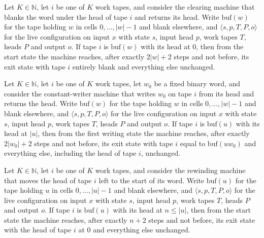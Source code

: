 \begin{theorem}
\label{Turing.NTimeDiag.qy_clear}
\leanok
{}
Let $K \in \mathbb{N}$, let $i$ be one of $K$ work tapes, and consider the clearing machine that
blanks the word under the head of tape $i$ and returns its head. Write $\mathrm{buf}(w)$ for the
tape holding $w$ in cells $0, \dots, |w| - 1$ and blank elsewhere, and
$\langle s, p, T, P, o\rangle$ for the live configuration on input $x$ with state $s$, input head
$p$, work tapes $T$, heads $P$ and output $o$. If tape $i$ is $\mathrm{buf}(w)$ with its head at
$0$, then from the start state the machine reaches, after exactly $2|w| + 2$ steps and not
before, its exit state with tape $i$ entirely blank and everything else unchanged.
\end{theorem}

\begin{theorem}
\label{Turing.NTimeDiag.qy_writeConst}
\leanok
{}
Let $K \in \mathbb{N}$, let $i$ be one of $K$ work tapes, let $w_0$ be a fixed binary word, and
consider the constant-writer machine that writes $w_0$ on tape $i$ from its head and returns the
head. Write $\mathrm{buf}(w)$ for the tape holding $w$ in cells $0, \dots, |w| - 1$ and blank
elsewhere, and $\langle s, p, T, P, o\rangle$ for the live configuration on input $x$ with state
$s$, input head $p$, work tapes $T$, heads $P$ and output $o$. If tape $i$ is $\mathrm{buf}(u)$
with its head at $|u|$, then from the first writing state the machine reaches, after exactly
$2|w_0| + 2$ steps and not before, its exit state with tape $i$ equal to $\mathrm{buf}(u w_0)$ and
everything else, including the head of tape $i$, unchanged.
\end{theorem}

\begin{theorem}
\label{Turing.NTimeDiag.qy_rewind}
\leanok
{}
Let $K \in \mathbb{N}$, let $i$ be one of $K$ work tapes, and consider the rewinding machine that
moves the head of tape $i$ left to the start of its word. Write $\mathrm{buf}(u)$ for the tape
holding $u$ in cells $0, \dots, |u| - 1$ and blank elsewhere, and $\langle s, p, T, P, o\rangle$
for the live configuration on input $x$ with state $s$, input head $p$, work tapes $T$, heads $P$
and output $o$. If tape $i$ is $\mathrm{buf}(u)$ with its head at $n \le |u|$, then from the start
state the machine reaches, after exactly $n + 2$ steps and not before, its exit state with the
head of tape $i$ at $0$ and everything else unchanged.
\end{theorem}


